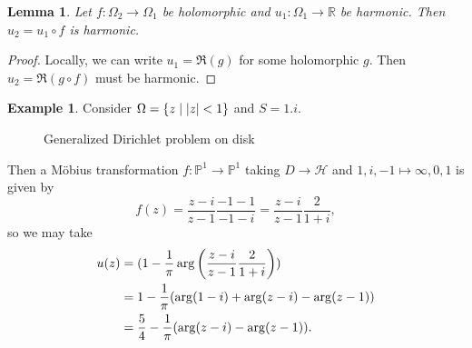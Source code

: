 \documentclass[leqno, openany]{memoir}
\newtheorem{lem}[thm]{Lemma}
\theoremstyle{definition}
\newtheorem{exm}[thm]{Example}
\theoremstyle{remark}
\theoremstyle{plain}
\theoremstyle{definition}
\theoremstyle{remark}
\newcommand{\R}{\mathbb{R}}
\renewcommand{\P}{\mathbb{P}}
\newcommand{\mc}[1]{\mathcal{#1}}
\begin{document}
\begin{lem}
    Let $f \colon \Omega_2 \to \Omega_1$ be holomorphic and $u_1 \colon \Omega_1 \to \R$ be harmonic. Then $u_2 = u_1 \circ f$ is harmonic.
\end{lem}

\begin{proof}
    Locally, we can write $u_1 = \Re(g)$ for some holomorphic $g$. Then $u_2 = \Re(g \circ f)$ must be harmonic.
\end{proof}

\begin{exm}
    Consider $\Omega = \qty{z \mid \abs{z} < 1}$ and $S = \qty{1, i}$.
    \begin{figure}[H]
    \begin{center}
    \end{center}
    \caption{Generalized Dirichlet problem on disk}%
    \label{fig:generalized-dirichlet-problem-disk}
    \end{figure}
    Then a M\"obius transformation $f \colon \P^1 \to \P^1$ taking $D \to \mc{H}$ and $1, i, -1 \mapsto \infty, 0, 1$ is given by
    \[ f(z) = \frac{z-i}{z-1} \frac{-1-1}{-1-i} = \frac{z-i}{z-1} \frac{2}{1+i}, \]
    so we may take
    \begin{align*} 
        u(z) &= (1 - \frac{1}{\pi} \arg \qty(\frac{z-i}{z-1} \frac{2}{1+i})) \\ 
             &= 1 - \frac{1}{\pi} (\arg(1-i) + \arg(z-i) -\arg(z-1)) \\ 
             &= \frac{5}{4} - \frac{1}{\pi} (\arg(z-i) - \arg(z-1)). 
    \end{align*}
\end{exm}
\end{document}
